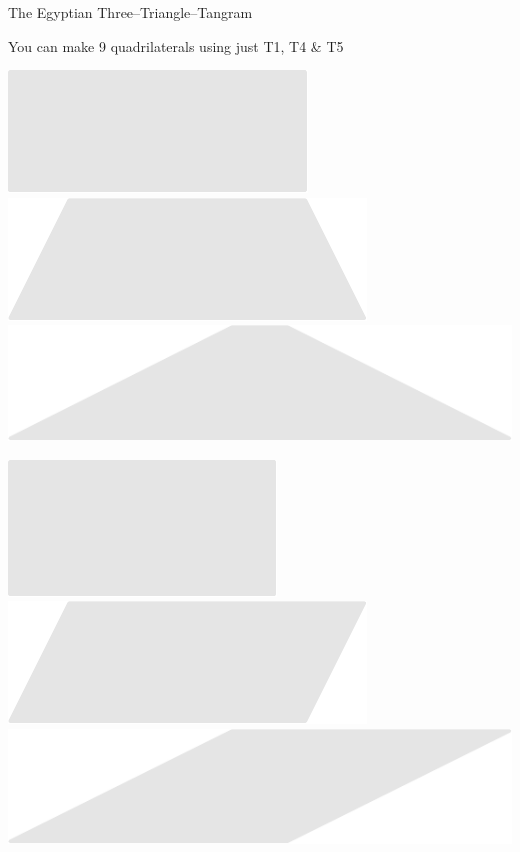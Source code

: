\documentclass[14pt]{beamer}
\begin{document}
    \begin{frame}{The Egyptian Three--Triangle--Tangram}
        \begin{center}
            You can make 9 quadrilaterals using just T1, T4 \& T5

            \bigskip \bigskip

            \includegraphics[scale=0.39]{figures/figure004b.pdf}\qquad
            \includegraphics[scale=0.39]{figures/figure004e.pdf}\qquad
            \includegraphics[scale=0.39]{figures/figure004f.pdf}\\

            \bigskip\medskip

            \;\;\includegraphics[scale=0.39]{figures/figure004a.pdf}\qquad
            \includegraphics[scale=0.39]{figures/figure004h.pdf}\qquad
            \includegraphics[scale=0.39]{figures/figure004i.pdf}\\


\end{center}
\end{frame}
\end{document}
